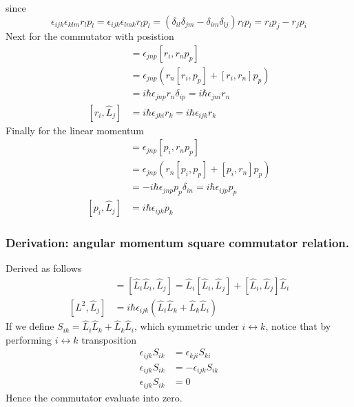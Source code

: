 \documentclass[../../../main.tex]{subfiles}
\begin{document}
since 
\begin{equation*}
    \epsilon_{ijk}\epsilon_{klm} r_l p_l =  
    \epsilon_{ijk}\epsilon_{lmk} r_l p_l =  
    (\delta_{il}\delta_{jm} - \delta_{im}\delta_{lj})    r_l p_l =  
    r_i p_j  -r_jp_i
\end{equation*}
Next for the commutator with posistion
\begin{align*}
    [r_i,\hat{L}_j]
     & =  \epsilon_{jnp}[r_i,r_np_p]                                       \\
     & = \epsilon_{jnp} \left( r_n[r_i,p_p ]+[r_i,r_n ]p_p \right)         \\
     & =  i \hbar \epsilon_{jnp }r_n \delta_{ip}=i \hbar \epsilon_{jni}r_n \\
    [r_i,\hat{L}_j]
     & = i \hbar \epsilon_{jki}r_k = i \hbar \epsilon_{ijk}r_k
\end{align*}
Finally for the linear momentum
\begin{align*}
    [p_i,\hat{L}_j]
     & =  \epsilon_{jnp}[p_i,r_np_p]                                           \\
     & = \epsilon_{jnp} \left( r_n[p_i,p_p ]+[p_i,r_n ]p_p \right)             \\
     & =  -i \hbar \epsilon_{jnp }p_p \delta_{in} = i \hbar  \epsilon_{ijp}p_p \\
    [p_i,\hat{L}_j]
     & = i \hbar \epsilon_{ijk}p_k
\end{align*}

\subsubsection*{Derivation: angular momentum square commutator relation.}
Derived as follows
\begin{align*}
    [L^2, \hat{L}_j]
     & = [\hat{L}_i \hat{L}_i, \hat{L}_j] =  \hat{L}_i[\hat{L}_i, \hat{L}_j] + [\hat{L}_i, \hat{L}_j]\hat{L}_i \\
    [L^2, \hat{L}_j]
     & = i \hbar \epsilon_{ijk} (\hat{L}_i \hat{L}_k + \hat{L}_k \hat{L}_i)
\end{align*}
If we define $S_{ik}=\hat{L}_i \hat{L}_k + \hat{L}_k \hat{L}_i$, which symmetric under $i \leftrightarrow k$, notice that by performing $i \leftrightarrow k$ transposition
\begin{align*}
    \epsilon_{ijk}S_{ik} & = \epsilon_{kji}S_{ki}  \\
    \epsilon_{ijk}S_{ik} & = -\epsilon_{ijk}S_{ik} \\
    \epsilon_{ijk}S_{ik} & = 0
\end{align*}
Hence the commutator evaluate into zero.
\end{document}
